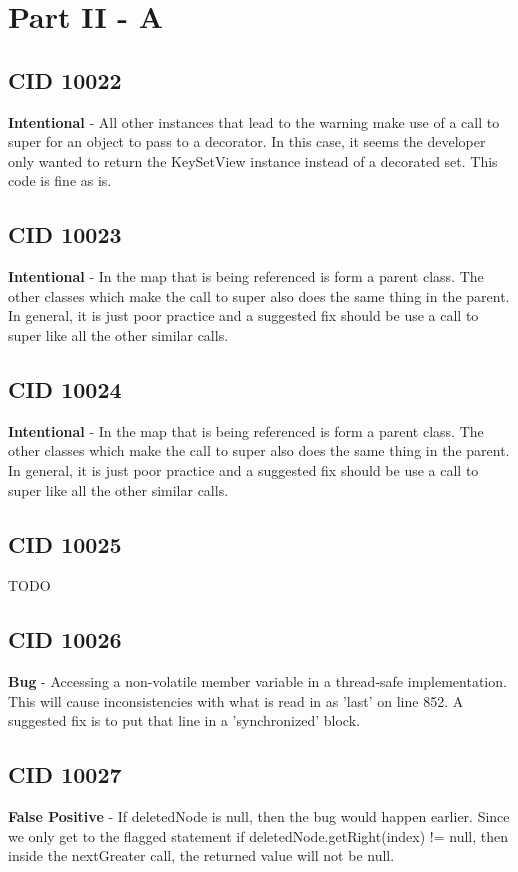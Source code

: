 \documentclass[12pt]{article}
\begin{document}
\section{Part II - A}
\subsection{CID 10022}
\textbf{Intentional} - All other instances that lead to the warning make use of a call to super for an object to pass to a decorator. In this case, it seems the developer only wanted to return the KeySetView instance instead of a decorated set. This code is fine as is.
\subsection{CID 10023}
\textbf{Intentional} - In the map that is being referenced is form a parent class. The other classes which make the call to super also does the same thing in the parent. In general, it is just poor practice and a suggested fix should be use a call to super like all the other similar calls.
\subsection{CID 10024}
\textbf{Intentional} - In the map that is being referenced is form a parent class. The other classes which make the call to super also does the same thing in the parent. In general, it is just poor practice and a suggested fix should be use a call to super like all the other similar calls.
\subsection{CID 10025}
TODO
\subsection{CID 10026}
\textbf{Bug} - Accessing a non-volatile member variable in a thread-safe implementation. This will cause inconsistencies with what is read in as 'last' on line 852. A suggested fix is to put that line in a 'synchronized' block.
\subsection{CID 10027}
\textbf{False Positive} - If deletedNode is null, then the bug would happen earlier. Since we only get to the flagged statement if deletedNode.getRight(index) != null, then inside the nextGreater call, the returned value will not be null.
\end{document}

